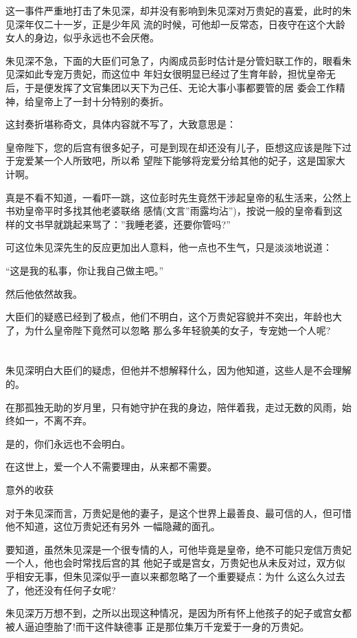 \documentclass[11pt,a4paper,onecolumn]{article}
\begin{document}
这一事件严重地打击了朱见深，却并没有影响到朱见深对万贵妃的喜爱，此时的朱见深年仅二十一岁，正是少年风
流的时候，可他却一反常态，日夜守在这个大龄女人的身边，似乎永远也不会厌倦。

朱见深不急，下面的大臣们可急了，内阁成员彭时估计是分管妇联工作的，眼看朱见深如此专宠万贵妃，而这位中
年妇女很明显已经过了生育年龄，担忧皇帝无后，于是便发挥了文官集团以天下为己任、无论大事小事都要管的居
委会工作精神，给皇帝上了一封十分特别的奏折。

这封奏折堪称奇文，具体内容就不写了，大致意思是：

皇帝陛下，您的后宫有很多妃子，可是到现在却还没有儿子，臣想这应该是陛下过于宠爱某一个人所致吧，所以希
望陛下能够将宠爱分给其他的妃子，这是国家大计啊。

真是不看不知道，一看吓一跳，这位彭时先生竟然干涉起皇帝的私生活来，公然上书劝皇帝平时多找其他老婆联络
感情(文言''雨露均沾'')，按说一般的皇帝看到这样的文书早就跳起来骂了：''我睡老婆，还要你管吗?''

可这位朱见深先生的反应更加出人意料，他一点也不生气，只是淡淡地说道：

``这是我的私事，你让我自己做主吧。''

然后他依然故我。

大臣们的疑惑已经到了极点，他们不明白，这个万贵妃容貌并不突出，年龄也大了，为什么皇帝陛下竟然可以忽略
那么多年轻貌美的女子，专宠她一个人呢?

\section[\thesection]{}

朱见深明白大臣们的疑虑，但他并不想解释什么，因为他知道，这些人是不会理解的。

在那孤独无助的岁月里，只有她守护在我的身边，陪伴着我，走过无数的风雨，始终如一，不离不弃。

是的，你们永远也不会明白。

在这世上，爱一个人不需要理由，从来都不需要。

意外的收获

对于朱见深而言，万贵妃是他的妻子，是这个世界上最善良、最可信的人，但可惜他不知道，这位万贵妃还有另外
一幅隐藏的面孔。

要知道，虽然朱见深是一个很专情的人，可他毕竟是皇帝，绝不可能只宠信万贵妃一个人，他也会时常找后宫的其
他妃子或是宫女，万贵妃也从未反对过，双方似乎相安无事，但朱见深似乎一直以来都忽略了一个重要疑点：为什
么这么久过去了，他还没有任何子女呢?

朱见深万万想不到，之所以出现这种情况，是因为所有怀上他孩子的妃子或宫女都被人逼迫堕胎了!而干这件缺德事
正是那位集万千宠爱于一身的万贵妃。
\end{document}
